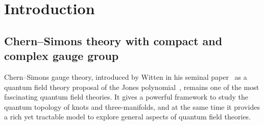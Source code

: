 \documentclass[12pt,reqno]{amsart}
\theoremstyle{definition}
\def\md{\mathbf}
\newcommand{\knot}[1]{\md{#1}}
\begin{document}
\begin{abstract}
  The partition function of complex Chern-Simons theory on a
  3-manifold with torus boundary reduces to a finite dimensional
  state-integral which is a holomorphic function of a complexified
  Planck's constant $\tau$ in the complex cut plane and an entire
  function of a complex parameter $u$. This gives rise to a vector of
  factorially divergent perturbative formal power series whose Stokes
  rays form a peacock-like pattern in the complex plane.

  We conjecture that these perturbative series are resurgent, their
  trans-series involve two non-perturbative variables, their Stokes
  automorphism satisfies a unique factorization property and that it
  is given explicitly in terms of a fundamental matrix solution to a (dual)
  linear $q$-difference equation. We further conjecture that a
  distinguished entry of the Stokes automorphism matrix is
  the 3D-index of Dimofte--Gaiotto--Gukov. We provide proofs of our
  statements regarding the $q$-difference equations and their
  properties of their fundamental solutions and illustrate our
  conjectures regarding the Stokes matrices with numerical calculations
  for the two simplest hyperbolic $\knot{4}_1$ and $\knot{5}_2$ knots.
\end{abstract}

\maketitle

{\footnotesize
\tableofcontents
}


\section{Introduction}
\label{sec.intro}

\subsection{Chern--Simons theory with compact and complex
  gauge group}
\label{sub.intro}


Chern--Simons gauge theory, introduced by Witten in his seminal
paper~\cite{witten-jones} as a quantum field theory proposal of the
Jones polynomial~\cite{Jones}, remains one of the most fascinating
quantum field theories. It gives a powerful framework to study the
quantum topology of knots and three-manifolds, and at the same time it
provides a rich yet tractable model to explore general aspects of
quantum field theories.
\end{document}
